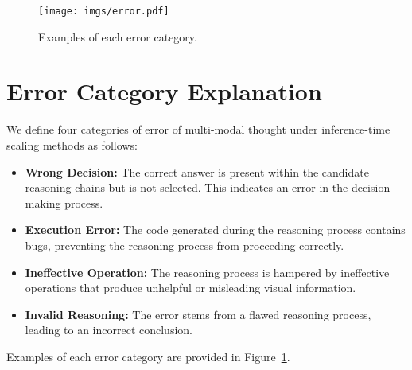 \begin{figure}[t]
  \texttt{[image: imgs/error.pdf]}
  \caption{Examples of each error category.}
  \label{fig:error_type}
\end{figure}

\section{Error Category Explanation}
\label{sec:app_error}


We define four categories of error of multi-modal thought under inference-time scaling methods as follows:

\begin{itemize}
\item \textbf{Wrong Decision:} The correct answer is present within the candidate reasoning chains but is not selected. This indicates an error in the decision-making process.
\item \textbf{Execution Error:} The code generated during the reasoning process contains bugs, preventing the reasoning process from proceeding correctly.
\item \textbf{Ineffective Operation:} The reasoning process is hampered by ineffective operations that produce unhelpful or misleading visual information.
\item \textbf{Invalid Reasoning:} The error stems from a flawed reasoning process, leading to an incorrect conclusion.
\end{itemize}

Examples of each error category are provided in Figure~\ref{fig:error_type}.


